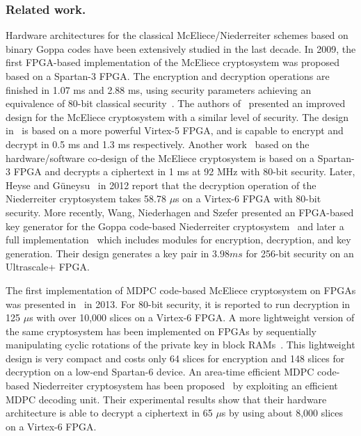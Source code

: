 \documentclass[runningheads]{llncs}
\begin{document}
\subsubsection{Related work.}
Hardware architectures for the classical McEliece/Niederreiter
schemes based on binary Goppa
codes have been extensively studied in the last decade.
In 2009, the first FPGA-based implementation of the McEliece cryptosystem was proposed based on
a Spartan-3 FPGA.
The encryption and decryption operations are finished in 1.07 ms and 2.88 ms,
using security parameters achieving an equivalence of 80-bit classical security~\cite{eisenbarth2009microeliece}.
The authors of~\cite{shoufan2010novel} presented an improved design for the McEliece cryptosystem
with a similar level of security.
The design in~\cite{shoufan2010novel} is based on a more powerful Virtex-5 FPGA,
and is capable to encrypt and decrypt in 0.5 ms and 1.3 ms respectively.
Another work~\cite{ghosh2012speed} based on the
hardware/software co-design of the McEliece cryptosystem
is based on a Spartan-3 FPGA and decrypts a ciphertext in 1 ms at
92 MHz with
80-bit security.
Later, Heyse and G\"uneysu~\cite{heyse2012towards} in 2012 report
that the decryption operation of the Niederreiter cryptosystem
takes 58.78 $\mu$s on a Virtex-6 FPGA
with 80-bit security.
More recently, Wang, Niederhagen and Szefer presented
an FPGA-based key generator for the Goppa code-based Niederreiter cryptosystem~\cite{wang2017fpga} and later a full implementation~\cite{wang2018fpga} which includes modules for encryption, decryption, and key generation.
Their design generates a key pair in $3.98 ms$ for 256-bit security on an Ultrascale+ FPGA.

The first implementation of MDPC code-based McEliece cryptosystem on FPGAs
was presented in~\cite{heyse2013smaller} in 2013.
For 80-bit security, it is reported to run decryption in 125 $\mu$s
with over 10,000 slices on a Virtex-6 FPGA.
A more lightweight version of the same cryptosystem has been implemented
on FPGAs by sequentially manipulating cyclic rotations of the private key in block RAMs~\cite{von2014lightweight}.
This lightweight design is very compact and costs only 64 slices for encryption and
148 slices for decryption on a low-end Spartan-6 device.
An area-time efficient MDPC code-based Niederreiter cryptosystem has been proposed~\cite{hu2017area}
by exploiting an efficient MDPC decoding unit.
Their experimental results show that their hardware architecture is able to decrypt a
ciphertext in 65 $\mu$s by using about 8,000 slices on a Virtex-6 FPGA.
\end{document}

